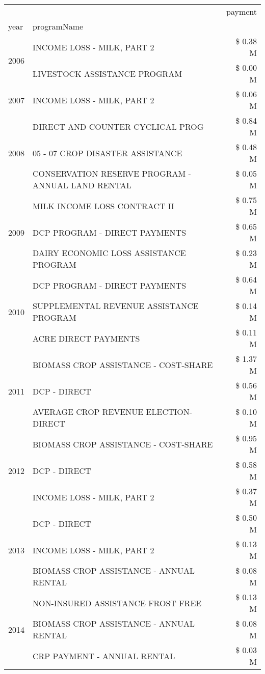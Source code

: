 \begin{tabular}{llr}
\toprule
 &  & payment \\
year & programName &  \\
\midrule
\multirow[t]{2}{*}{2006} & INCOME LOSS - MILK, PART 2 & \$ 0.38 M \\
 & LIVESTOCK ASSISTANCE PROGRAM & \$ 0.00 M \\
\cline{1-3}
2007 & INCOME LOSS - MILK, PART 2 & \$ 0.06 M \\
\cline{1-3}
\multirow[t]{3}{*}{2008} & DIRECT AND COUNTER CYCLICAL PROG & \$ 0.84 M \\
 & 05 - 07 CROP DISASTER ASSISTANCE & \$ 0.48 M \\
 & CONSERVATION RESERVE PROGRAM - ANNUAL LAND RENTAL & \$ 0.05 M \\
\cline{1-3}
\multirow[t]{3}{*}{2009} & MILK INCOME LOSS CONTRACT II & \$ 0.75 M \\
 & DCP PROGRAM - DIRECT PAYMENTS & \$ 0.65 M \\
 & DAIRY ECONOMIC LOSS ASSISTANCE PROGRAM & \$ 0.23 M \\
\cline{1-3}
\multirow[t]{3}{*}{2010} & DCP PROGRAM - DIRECT PAYMENTS & \$ 0.64 M \\
 & SUPPLEMENTAL REVENUE ASSISTANCE PROGRAM & \$ 0.14 M \\
 & ACRE DIRECT PAYMENTS & \$ 0.11 M \\
\cline{1-3}
\multirow[t]{3}{*}{2011} & BIOMASS CROP ASSISTANCE - COST-SHARE & \$ 1.37 M \\
 & DCP - DIRECT & \$ 0.56 M \\
 & AVERAGE CROP REVENUE ELECTION-DIRECT & \$ 0.10 M \\
\cline{1-3}
\multirow[t]{3}{*}{2012} & BIOMASS CROP ASSISTANCE - COST-SHARE & \$ 0.95 M \\
 & DCP - DIRECT & \$ 0.58 M \\
 & INCOME LOSS - MILK, PART 2 & \$ 0.37 M \\
\cline{1-3}
\multirow[t]{3}{*}{2013} & DCP - DIRECT & \$ 0.50 M \\
 & INCOME LOSS - MILK, PART 2 & \$ 0.13 M \\
 & BIOMASS CROP ASSISTANCE - ANNUAL RENTAL & \$ 0.08 M \\
\cline{1-3}
\multirow[t]{3}{*}{2014} & NON-INSURED ASSISTANCE FROST FREE & \$ 0.13 M \\
 & BIOMASS CROP ASSISTANCE - ANNUAL RENTAL & \$ 0.08 M \\
 & CRP PAYMENT - ANNUAL RENTAL & \$ 0.03 M \\

\end{tabular}
